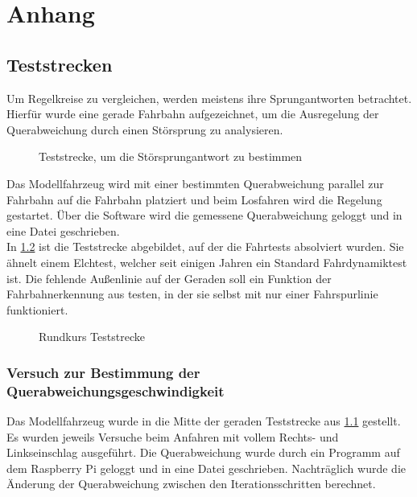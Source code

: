 
\chapter{Anhang}
\label{ch:Anhang}
\section{Teststrecken}
Um Regelkreise zu vergleichen, werden meistens ihre Sprungantworten betrachtet. Hierfür wurde eine gerade Fahrbahn aufgezeichnet, um die Ausregelung der Querabweichung durch einen Störsprung zu analysieren. 
\begin{figure}[H]
  \centering
  \caption[Erste Teststrecke]{Teststrecke, um die Störsprungantwort zu bestimmen}
  \label{fig:Stoersprung}
\end{figure}
Das Modellfahrzeug wird mit einer bestimmten Querabweichung parallel zur Fahrbahn auf die Fahrbahn platziert und beim Losfahren wird die Regelung gestartet. Über die Software wird die gemessene Querabweichung geloggt und in eine Datei geschrieben.\\

In \ref{fig:Rundkurs} ist die Teststrecke abgebildet, auf der die Fahrtests absolviert wurden. Sie ähnelt einem Elchtest, welcher seit einigen Jahren ein Standard Fahrdynamiktest ist. Die fehlende Außenlinie auf der Geraden soll ein Funktion der Fahrbahnerkennung aus \cite{Julius} testen, in der sie selbst mit nur einer Fahrspurlinie funk\-tioniert.
\begin{figure}[H]
  \centering
  \caption[Zweite Teststrecke]{Rundkurs Teststrecke}
  \label{fig:Rundkurs}
\end{figure}
\subsection*{Versuch zur Bestimmung der Querabweichungsgeschwindigkeit}
Das Modellfahrzeug wurde in die Mitte der geraden Teststrecke aus \ref{fig:Stoersprung} gestellt. Es wurden jeweils Versuche beim Anfahren mit vollem Rechts- und Links\-einschlag ausgeführt. Die Querabweichung wurde durch ein Programm auf dem Raspberry Pi geloggt und in eine Datei geschrieben. Nachträglich wurde die Änderung der Querabweichung zwischen den Iterationsschritten berechnet.
